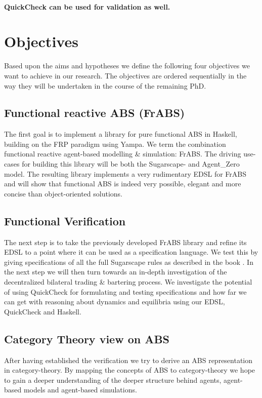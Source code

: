 \paragraph{QuickCheck can be used for validation as well.}



\section{Objectives}
Based upon the aims and hypotheses we define the following four objectives we want to achieve in our research. The objectives are ordered sequentially in the way they will be undertaken in the course of the remaining PhD.

\subsection{Functional reactive ABS (FrABS)}
The first goal is to implement a library for pure functional ABS in Haskell, building on the FRP paradigm using Yampa. We term the combination functional reactive agent-based modelling \& simulation: FrABS. The driving use-cases for building this library will be both the Sugarscape- and Agent\_Zero model. The resulting library implements a very rudimentary EDSL for FrABS and will show that functional ABS is indeed very possible, elegant and more concise than object-oriented solutions.

\subsection{Functional Verification}
The next step is to take the previously developed FrABS library and refine its EDSL to a point where it can be used as a specification language. We test this by giving specifications of all the full Sugarscape rules as described in the book \cite{epstein_growing_1996}. In the next step we will then turn towards an in-depth investigation of the decentralized bilateral trading \& bartering process. We investigate the potential of using QuickCheck for formulating and testing specifications and how far we can get with reasoning about dynamics and equilibria using our EDSL, QuickCheck and Haskell.

\subsection{Category Theory view on ABS}
After having established the verification we try to derive an ABS representation in category-theory. By mapping the concepts of ABS to category-theory we hope to gain a deeper understanding of the deeper structure behind agents, agent-based models and agent-based simulations.

